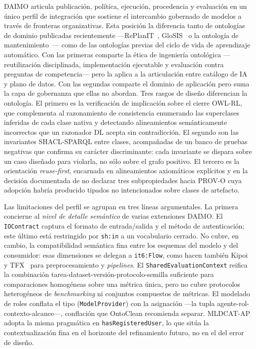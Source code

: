 \documentclass[Afour,sagev,times]{sagej}
\newcommand{\code}[1]{\texttt{#1}}
\begin{document}
DAIMO articula publicación, política, ejecución, procedencia y evaluación en un único perfil de integración que sostiene el intercambio gobernado de modelos a través de fronteras organizativas. Esta posición la diferencia tanto de ontologías de dominio publicadas recientemente ---RePlanIT~\cite{kurteva}, GloSIS~\cite{palma} o la ontología de mantenimiento~\cite{woods}--- como de las ontologías previas del ciclo de vida de aprendizaje automático. Con las primeras comparte la ética de ingeniería ontológica ---reutilización disciplinada, implementación ejecutable y evaluación contra preguntas de competencia--- pero la aplica a la articulación entre catálogo de IA y plano de datos. Con las segundas comparte el dominio de aplicación pero suma la capa de gobernanza que ellas no abordan. Tres rasgos de diseño diferencian la ontología. El primero es la verificación de implicación sobre el cierre OWL-RL, que complementa al razonamiento de consistencia enumerando las superclases inferidas de cada clase nativa y detectando alineamientos semánticamente incorrectos que un razonador DL acepta sin contradicción. El segundo son las invariantes SHACL-SPARQL entre clases, acompañadas de un banco de pruebas negativas que confirma su carácter discriminante: cada invariante se dispara sobre un caso diseñado para violarla, no sólo sobre el grafo positivo. El tercero es la orientación \emph{reuse-first}, encarnada en alineamientos axiomáticos explícitos y en la decisión documentada de no declarar tres subpropiedades hacia PROV-O cuya adopción habría producido tipados no intencionados sobre clases de artefacto.

Las limitaciones del perfil se agrupan en tres líneas argumentales. La primera concierne al \emph{nivel de detalle semántico} de varias extensiones DAIMO. El \code{IOContract} captura el formato de entrada/salida y el método de autenticación; este último está restringido por \code{sh:in} a un vocabulario cerrado. No cubre, en cambio, la compatibilidad semántica fina entre los esquemas del modelo y del consumidor: esas dimensiones se delegan a \code{it6:Flow}, como hacen también Kipoi~\cite{kipoi} y TFX~\cite{tfx} para preprocesamiento y \emph{pipelines}. El \code{SharedEvaluationContext} reifica la combinación tarea-dataset-versión-protocolo-semilla suficiente para comparaciones homogéneas sobre una métrica única, pero no cubre protocolos heterogéneos de \emph{benchmarking} ni conjuntos compuestos de métricas. El modelado de roles conflata el tipo (\code{ModelProvider}) con la asignación ---la tupla agente-rol-contexto-alcance---, conflación que OntoClean recomienda separar. MLDCAT-AP adopta la misma pragmática en \code{hasRegisteredUser}, lo que sitúa la contextualización fina en el horizonte del refinamiento futuro, no en el del error de diseño.
\end{document}
